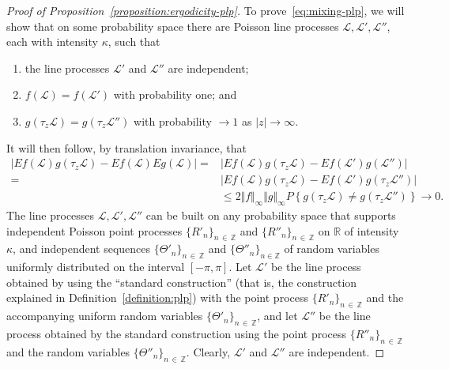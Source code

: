 \documentclass[AHL, Unicode, longabstracts, published]{cedram}
\newcommand{\xnorm}[1]{ \Vert #1 \Vert }
\newcommand{\zz}[1]{\mathbb #1}
\newcommand*{\alphenumi}{\renewcommand*{\theenumi}{\alph{enumi}}}
\begin{document}
\begin{proof}[Proof of Proposition~\ref{proposition:ergodicity-plp}]
To prove~\eqref{eq:mixing-plp}, we will show that on some probability space there are Poisson line processes $\mathcal{L},\mathcal{L}',\mathcal{L}''$, each with intensity $\kappa$, such that
\begin{enumerate}\alphenumi
\item\label{listproof2.7.1} the line processes $\mathcal{L}'$ and $\mathcal{L}''$ are independent;
\item \label{listproof2.7.2} $f (\mathcal{L})=f (\mathcal{L}')$ with probability one; and
\item \label{listproof2.7.3} $g (\tau_{z}\mathcal{L})=g (\tau_{z}\mathcal{L}'')$ with probability $\rightarrow 1$ as $|z| \rightarrow \infty$.
\end{enumerate}
It will then follow, by translation invariance, that
\begin{align*}
|Ef (\mathcal{L})g(\tau_{z}\mathcal{L})-Ef (\mathcal{L})Eg (\mathcal{L})|=&|Ef (\mathcal{L})g(\tau_{z}\mathcal{L})-Ef (\mathcal{L}')g(\mathcal{L}'')|\\
=&|Ef (\mathcal{L})g(\tau_{z}\mathcal{L})-Ef (\mathcal{L}')g (\tau_{z}\mathcal{L}'')|\\
&\leq 2\xnorm{f}_{\infty}\xnorm{g}_{\infty} P\left\{g (\tau_{z}\mathcal{L})\not =g (\tau_{z}\mathcal{L}'') \right\}
\longrightarrow 0.
\end{align*}
The line processes $\mathcal{L},\mathcal{L}',\mathcal{L}''$ can be built on any probability space that supports independent Poisson point processes $\{R'_{n} \}_{n\,\in\,\zz{Z}}$ and $\{R''_{n} \}_{n\,\in\,\zz{Z}}$ on $\zz{R}$ of intensity $\kappa$, and independent sequences $\{\Theta '_{n}\}_{n\,\in\,\zz{Z}}$ and $\{\Theta ''_{n} \}_{n\in\zz{Z}}$ of random variables uniformly distributed on the interval $[-\pi,\pi]$. Let $\mathcal{L}'$ be the line process obtained by using the ``standard construction'' (that is, the construction explained in Definition~\ref{definition:plp}) with the point process $\{R'_{n} \}_{n\,\in\,\zz{Z}}$ and the accompanying uniform random variables $\{\Theta '_{n}\}_{n\,\in\,\zz{Z}}$, and let $\mathcal{L}''$ be the line process obtained by the standard construction using the point process $\{R''_{n} \}_{n\,\in\,\zz{Z}}$ and the random variables $\{\Theta ''_{n}\}_{n\,\in\,\zz{Z}}$. Clearly, $\mathcal{L}'$ and $\mathcal{L}''$ are independent.


\end{proof}
\end{document}
